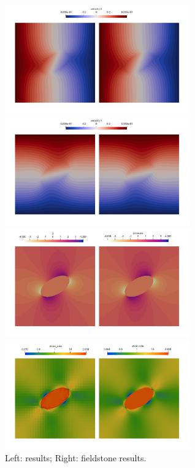 \begin{center}
\includegraphics[width=8cm]{python_codes/fieldstone_142/results/case2/aspect/u}
\includegraphics[width=8cm]{python_codes/fieldstone_142/results/case2/aspect/v}\\
\includegraphics[width=8cm]{python_codes/fieldstone_142/results/case2/aspect/press}
\includegraphics[width=8cm]{python_codes/fieldstone_142/results/case2/aspect/sr}\\
{\captionfont Left: \aspect results; Right: fieldstone results.}
\end{center}


\newpage
